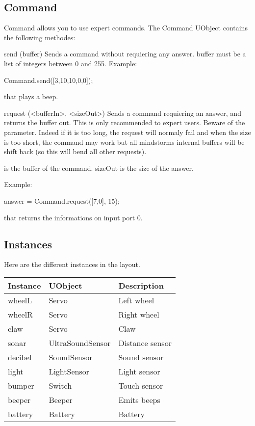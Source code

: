 \subsection{Command}
Command allows you to use expert commands. The Command UObject contains the
following methodes:
\begin{urbiscriptapi}
\item[send](buffer)
  Sends a command without requiering any answer.
buffer must be a list of integers between 0 and 255.
Example:
\begin{urbiunchecked}
  Command.send([3,10,10,0,0]);
\end{urbiunchecked}

that plays a beep.

\item[request](<bufferIn>, <sizeOut>)%
  Sends a command requiering an answer, and returns the buffer out. This is
  only recommended to expert users. Beware of the 
  parameter. Indeed if it is too long, the request will normaly fail and
  when the size is too short, the command may work but all mindstorms
  internal buffers will be shift back (so this will bend all other
  requests).

   is the buffer of the command. sizeOut is the size of the
  answer.

Example:
\begin{urbiunchecked}
  answer = Command.request([7,0], 15);
\end{urbiunchecked}

that returns the informations on input port 0.
\end{urbiscriptapi}

\subsection{Instances}
Here are the different instances in the  layout.

\begin{tabular}{|l|l|l|}
  \hline
  Instance & UObject          & Description    \\
  \hline
  wheelL   & Servo            & Left wheel     \\
  wheelR   & Servo            & Right wheel    \\
  claw     & Servo            & Claw           \\
  sonar    & UltraSoundSensor & Distance sensor\\
  decibel  & SoundSensor      & Sound sensor   \\
  light    & LightSensor      & Light sensor   \\
  bumper   & Switch           & Touch sensor   \\
  beeper   & Beeper           & Emits beeps    \\
  battery  & Battery          & Battery        \\
  \hline
\end{tabular}


